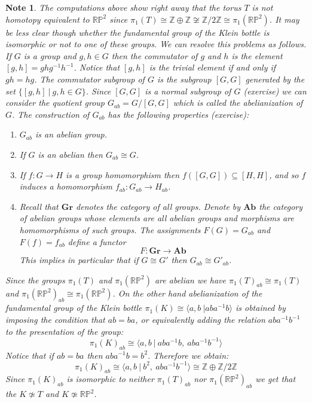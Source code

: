 \documentclass[11pt, letterpaper, oneside]{report}
\theoremstyle{pplain}
\theoremstyle{ddefinition}
\newtheorem{note}[theorem]{Note}
\theoremstyle{nnn}
\theoremstyle{eexercise}
\newcommand{\Z}{{\mathbb Z}}
\newcommand{\Ab}{{\mathbf{Ab}}}
\newcommand{\Gr}{{\mathbf{Gr}}}
\newcommand{\benu}{\begin{enumerate}}
\newcommand{\eenu}{\end{enumerate}}
\newcommand{\RP}{{\mathbb R\mathbb P}}
\begin{document}
\begin{note}
The computations above show right away that the torus $T$ is not homotopy equivalent to $\RP^{2}$
since $\pi_{1}(T) \cong \Z\oplus \Z \not\cong \Z/2\Z \cong \pi_{1}(\RP^{2})$.  It may be less clear  though
whether the fundamental group of the Klein bottle is isomorphic or not to one of these groups. We can resolve 
this problems as follows. If $G$  is a group and $g, h\in G$ then the \emph{commutator} 
of $g$ and $h$ is the element $[g, h] = ghg^{-1}h^{-1}$. Notice that $[g, h]$ is the trivial element 
if and only if $gh= hg$. The \emph{commutator subgroup} of $G$
is the subgroup $[G, G]$ generated by the set $\{[g, h] \ | \ g, h\in G\}$. Since  $[G, G]$ is a normal 
subgroup of $G$ (exercise) we can consider the quotient group $G_{ab} = G/[G, G]$ which is 
called the \emph{abelianization} of $G$. The construction of $G_{ab}$ has the following properties (exercise):
\benu
\item[\textbullet] $G_{ab}$ is an abelian group.
\item[\textbullet] If $G$ is an abelian then $G_{ab}\cong G$. 
\item[\textbullet] If $f\colon G \to H$ is a group homomorphism then $f([G, G])\subseteq [H, H]$, and so 
$f$ induces a homomorphism $f_{ab}\colon G_{ab} \to H_{ab}$. 
\item[\textbullet] Recall that $\Gr$ denotes the category of all groups. Denote by $\Ab$ the category 
of abelian groups whose elements are all abelian groups and morphisms are homomorphisms of 
such groups. The assignments $F(G) = G_{ab}$ and $F(f) = f_{ab}$ define a functor 
$$F\colon \Gr\to \Ab$$
This implies in particular that if  $G\cong G'$ then $G_{ab}\cong G'_{ab}$. 

\eenu
 
Since the groups $\pi_{1}(T)$ and $\pi_{1}(\RP^{2})$ are abelian we have 
$\pi_{1}(T)_{ab} \cong \pi_{1}(T)$ and $\pi_{1}(\RP^{2})_{ab}\cong \pi_{1}(\RP^{2})$. On the other hand 
abelianization of the fundamental group of the Klein bottle $\pi_{1}(K)\cong \langle a, b \ | aba^{-1}b\rangle$
is obtained by imposing the  condition that $ab=ba$, or equivalently adding the relation 
$aba^{-1}b^{-1}$ to the presentation of the group:
$$\pi_{1}(K)_{ab}\cong \langle a, b \ | \ aba^{-1}b, \ aba^{-1}b^{-1}\rangle$$
Notice that if $ab = ba$ then $aba^{-1}b = b^{2}$. Therefore  we obtain:
$$\pi_{1}(K)_{ab}\cong \langle a, b \ | \ b^{2}, \ aba^{-1}b^{-1}\rangle \cong \Z\oplus \Z/2\Z$$ 
Since $\pi_{1}(K)_{ab}$ is isomorphic to neither $\pi_{1}(T)_{ab}$ nor $\pi_{1}(\RP^{2})_{ab}$
we get that  the $K\not\simeq T$ and $K\not \simeq \RP^{2}$.  
\end{note}
\end{document}

